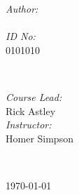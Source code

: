 \begin{titlepage}
    
    \begin{minipage}{0.4\textwidth}
    \begin{flushleft} \large
    \emph{Author:}\\
    \@author %
    \\[1.2em]
    \emph{ID No:}\\
    0101010 \\[1.2em]
    \end{flushleft}
    \end{minipage}
    ~
    \begin{minipage}{0.4\textwidth}
    \begin{flushright} \large
    \emph{Course Lead:} \\
    Rick Astley  \\[1.2em] %
    \emph{Instructor:} \\
    Homer Simpson %
    \end{flushright}
    \end{minipage}\\[2cm]
    \makeatother
    
    
    
    {\large \today}\\[2cm] %
    
    \vfill %
    
    \end{titlepage}